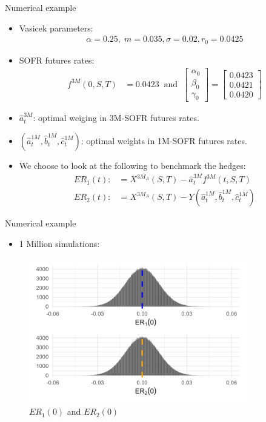 \documentclass[UKenglish]{beamer}
\begin{document}
\begin{frame}{Numerical example}
\begin{itemize}
    \item Vasicek parameters: 
    \begin{align*}
    \alpha = 0.25, \; m = 0.035, \sigma = 0.02, r_{0} = 0.0425  
    \end{align*} 
    \item SOFR futures rates: 
    \begin{align*}
    f^{3M}(0,S,T) &= 0.0423
    \;\;\text{and}\;\;
    \begin{bmatrix}
    \alpha_{0} \\ 
    \beta_{0} \\ 
    \gamma_{0} 
    \end{bmatrix}
    =
    \begin{bmatrix}
    0.0423 \\ 
    0.0421 \\ 
    0.0420 
    \end{bmatrix}
    \end{align*}
    \item $\hat{a}_{t}^{3M}$: optimal weiging in 3M-SOFR futures rates. 
    \item $(\hat{a}_{t}^{1M}, \hat{b}_{t}^{1M}, \hat{c}_{t}^{1M})$: optimal weights in 1M-SOFR futures rates. 
    \item We choose to look at the following to benchmark the hedges:
    \begin{align*}
    ER_{1}(t) :&= X^{3M_{A}}(S,T) - \hat{a}_{t}^{3M}f^{3M}(t,S,T) \\ 
    ER_{2}(t) :&= X^{3M_{A}}(S,T) - Y(\hat{a}_{t}^{1M}, \hat{b}_{t}^{1M}, \hat{c}_{t}^{1M})
    \end{align*}    
\end{itemize}
    
\end{frame}




\begin{frame}{Numerical example}
\begin{itemize}
    \item 1 Million simulations:
\end{itemize}

\begin{figure}[htp]
    \centering
    \includegraphics[width=9.5cm]{SOFR/SOFR_error_plt.png}
    \caption{$ER_{1}(0)$ and $ER_{2}(0)$}
    \label{fig: SOFR_error_plt}
\end{figure}

    
\end{frame}
\end{document}
